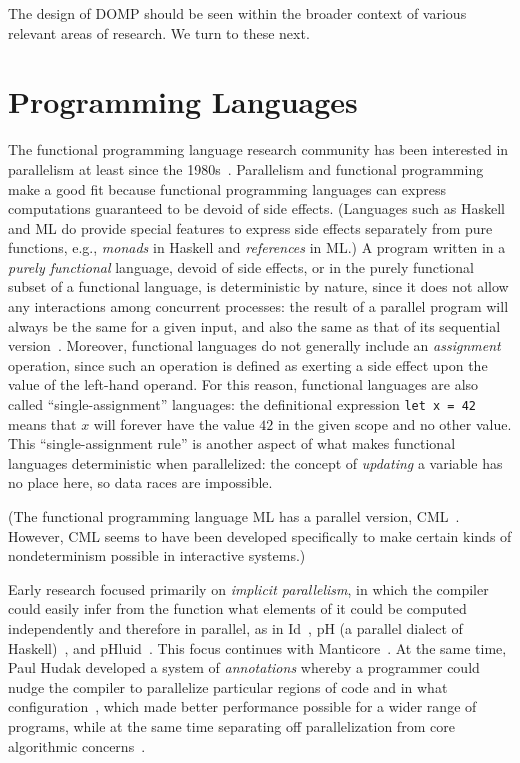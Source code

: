 \parasep

The design of DOMP should be seen within the broader context of various relevant areas of research.  We turn to these next.

\section{Programming Languages}
The functional programming language research community has been interested in parallelism at least since the 1980s~\cite{peytonjones89parallel}.  Parallelism and functional programming make a good fit because functional programming languages can express computations guaranteed to be devoid of side effects.  (Languages such as Haskell and ML do provide special features to express side effects separately from pure functions, e.g., \textit{monads} in Haskell and \textit{references} in ML.)  A program written in a \textit{purely functional} language, devoid of side effects, or in the purely functional subset of a functional language, is deterministic by nature, since it does not allow any interactions among concurrent processes:  the result of a parallel program will always be the same for a given input, and also the same as that of its sequential version~\cite{hammond94functional}.  Moreover, functional languages do not generally include an \textit{assignment} operation, since such an operation is defined as exerting a side effect upon the value of the left-hand operand.  For this reason, functional languages are also called ``single-assignment'' languages:  the definitional expression \texttt{let x = 42} means that $x$ will forever have the value $42$ in the given scope and no other value.  This ``single-assignment rule'' is another aspect of what makes functional languages deterministic when parallelized:  the concept of \textit{updating} a variable has no place here, so data races are impossible.

(The functional programming language ML has a parallel version, CML~\cite{reppy93cml}.  However, CML seems to have been developed specifically to make certain kinds of nondeterminism possible in interactive systems.)

Early research focused primarily on \textit{implicit parallelism}, in which the compiler could easily infer from the function what elements of it could be computed independently and therefore in parallel, as in Id~\cite{nikhil93id}, pH (a parallel dialect of Haskell)~\cite{aditya95ph}, and pHluid~\cite{flanagan96phluid}.  This focus continues with Manticore~\cite{fluet10manticore}.  At the same time, Paul Hudak developed a system of \textit{annotations} whereby a programmer could nudge the compiler to parallelize particular regions of code and in what configuration~\cite{hudak86parafunctional}, which made better performance possible for a wider range of programs, while at the same time separating off parallelization from core algorithmic concerns~\cite{trinder98algorithm}.

